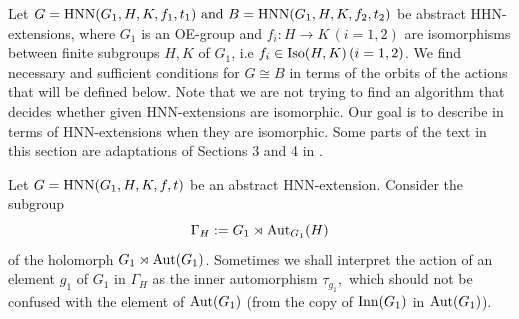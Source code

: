 \documentclass[a4paper,12pt]{article}
\newtheorem{prop}[thm]{Proposition}
\def\aut {{\rm Aut}}
\def\inn {{\rm Inn}}
\def\hnn {{\rm HNN}}
\def\Iso {{\rm Iso}}
\begin{document}
{%
 
Let $G=\hnn(G_1, H, K, f_1, t_1) \mbox{ and } B=\hnn(G_1, H, K, f_2, t_2)$ be abstract HHN-extensions, where $G_1$ is an OE-group and $f_{i}: H\longrightarrow K\,(i=1,2)$ are  isomorphisms between finite subgroups $H, K$ of $G_1$, i.e $f_i \in \Iso(H, K)\,(i=1,2)$. We find necessary and 
sufficient conditions for $G\cong B$ in terms of the orbits of the actions that will be defined below. Note that we are not trying to find an algorithm that decides whether given HNN-extensions are isomorphic. Our goal is to describe in terms of HNN-extensions when they are isomorphic. 
Some parts of the text in this section are adaptations of Sections 3 and 4 in \cite{BZ}.

Let $G=\hnn(G_1, H, K, f, t)$ be an abstract HNN-extension.  Consider the subgroup 
 \begin{equation} \label{gamma H} \Gamma_H:=G_1 \rtimes \aut_{G_1}(H)\end{equation} of the holomorph $G_1\rtimes \aut(G_1)$. 
Sometimes we shall interpret the action of an element $g_1$ of $G_1$ in $\Gamma_H$ as the inner automorphism $\tau_{g_1},$ which should not be confused with the element of $\aut(G_1)$ (from the copy of $\inn(G_1)$ in $\aut(G_1)$).

}
\end{document}
